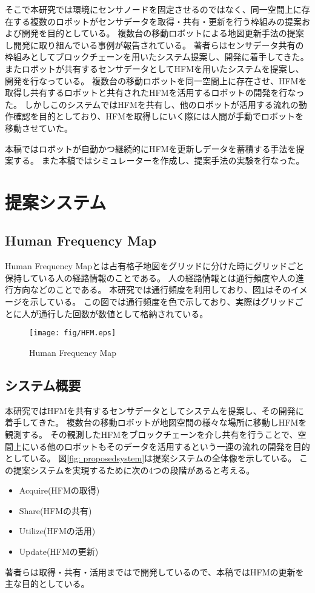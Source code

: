 \documentclass{jsarticle}
\begin{document}
そこで本研究では環境にセンサノードを固定させるのではなく、同一空間上に存在する複数のロボットがセンサデータを取得・共有・更新を行う枠組みの提案および開発を目的としている。
複数台の移動ロボットによる地図更新手法の提案し開発に取り組んでいる事例が報告されている\cite{toyota}。
著者らはセンサデータ共有の枠組みとしてブロックチェーンを用いたシステム提案し、開発に着手してきた\cite{robo2018}。
またロボットが共有するセンサデータとしてHFMを用いたシステムを提案し、開発を行なっている\cite{si2018}\cite{kato}。
複数台の移動ロボットを同一空間上に存在させ、HFMを取得し共有するロボットと共有されたHFMを活用するロボットの開発を行なった。
しかしこのシステムではHFMを共有し、他のロボットが活用する流れの動作確認を目的としており、HFMを取得しにいく際には人間が手動でロボットを移動させていた。

本稿ではロボットが自動かつ継続的にHFMを更新しデータを蓄積する手法を提案する。
また本稿ではシミュレーターを作成し、提案手法の実験を行なった。


\section{提案システム}
\subsection{Human Frequency Map}
Human Frequency Mapとは占有格子地図をグリッドに分けた時にグリッドごと保持している人の経路情報のことである。
人の経路情報とは通行頻度や人の進行方向などのことである。
本研究では通行頻度を利用しており、図\ref{fig: HFM}はそのイメージを示している。
この図では通行頻度を色で示しており、実際はグリッドごとに人が通行した回数が数値として格納されている。
\begin{figure}[tbh]
 \centering
  \texttt{[image: fig/HFM.eps]}
  \vspace*{-4mm}
  \caption{Human Frequency Map}
  \label{fig: HFM}
\end{figure}

\subsection{システム概要}
本研究ではHFMを共有するセンサデータとしてシステムを提案し、その開発に着手してきた。
複数台の移動ロボットが地図空間の様々な場所に移動しHFMを観測する。
その観測したHFMをブロックチェーンを介し共有を行うことで、空間上にいる他のロボットもそのデータを活用するという一連の流れの開発を目的としている。
図\ref{fig: proposedsystem}は提案システムの全体像を示している。
この提案システムを実現するために次の4つの段階があると考える。
\begin{itemize}
  \item Acquire(HFMの取得)
  \item Share(HFMの共有)
  \item Utilize(HFMの活用)
  \item Update(HFMの更新)
\end{itemize}
著者らは取得・共有・活用までは\cite{si2018}で開発しているので、本稿ではHFMの更新を主な目的としている。
\end{document}
